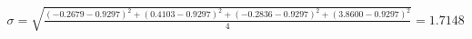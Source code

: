 \documentclass[preview]{standalone}
\begin{document}
\begin{align*}
\sigma = \sqrt{\frac{(-0.2679 - 0.9297)^2 + (0.4103 - 0.9297)^2 + (-0.2836 - 0.9297)^2 + (3.8600 - 0.9297)^2}{4}} = 1.7148
\end{align*}
\end{document}
